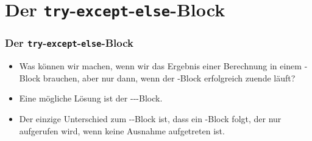 \documentclass[aspectratio=169,mathserif,notheorems]{beamer}%
\begin{document}
\section{Der \texttt{try}-\texttt{except}-\texttt{else}-Block}%
%
\begin{frame}[t]%
\frametitle{Der \texttt{try}-\texttt{except}-\texttt{else}-Block}%
\begin{itemize}%
%
\item Was können wir machen, wenn wir das Ergebnis einer Berechnung in einem -Block brauchen, aber nur dann, wenn der -Block erfolgreich zuende läuft?%
%
\item<2-> Eine mögliche Lösung ist der ---Block.%
%
\item<3-> Der einzige Unterschied zum --Block ist, dass ein -Block folgt, der nur aufgerufen wird, wenn \alert{keine} Ausnahme aufgetreten ist.%
%
\end{itemize}%
%
%
%
\end{frame}%
%
\end{document}
